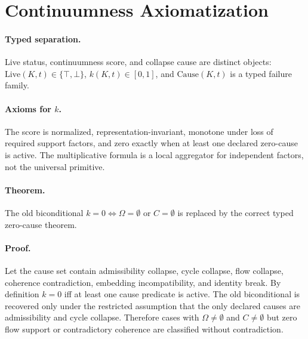 
\section{Continuumness Axiomatization}
\label{app:oc133-continuumness}

\paragraph{Typed separation.}
Live status, continuumness score, and collapse cause are distinct objects:
\(\mathrm{Live}(K,t)\in\{\top,\bot\}\), \(k(K,t)\in[0,1]\), and
\(\mathrm{Cause}(K,t)\) is a typed failure family.

\paragraph{Axioms for \(k\).}
The score is normalized, representation-invariant, monotone under loss of
required support factors, and zero exactly when at least one declared
zero-cause is active.  The multiplicative formula is a local aggregator for
independent factors, not the universal primitive.

\paragraph{Theorem.}
The old biconditional \(k=0\Leftrightarrow \Omega=\emptyset\) or \(C=\emptyset\)
is replaced by the correct typed zero-cause theorem.

\paragraph{Proof.}
Let the cause set contain admissibility collapse, cycle collapse, flow collapse,
coherence contradiction, embedding incompatibility, and identity break.  By
definition \(k=0\) iff at least one cause predicate is active.  The old
biconditional is recovered only under the restricted assumption that the only
declared causes are admissibility and cycle collapse.  Therefore cases with
\(\Omega\neq\emptyset\) and \(C\neq\emptyset\) but zero flow support or
contradictory coherence are classified without contradiction.
